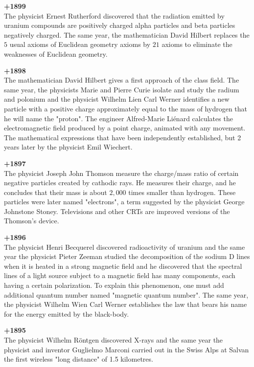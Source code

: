 \textbf{+1899}\\
The physicist Ernest Rutherford discovered that the radiation emitted by uranium compounds are positively charged alpha particles and beta particles negatively charged. The same year, the mathematician David Hilbert replaces the $5$ usual axioms of Euclidean geometry axioms by $21$ axioms to eliminate the weaknesses of Euclidean geometry. 

\textbf{+1898}\\
The mathematician David Hilbert gives a first approach of the class field. The same year, the physicists Marie and Pierre Curie isolate and study the radium and polonium and the physicist Wilhelm Lien Carl Werner identifies a new particle with a positive charge approximately equal to the mass of hydrogen that he will name the "proton". The engineer Alfred-Marie Liénard calculates the electromagnetic field produced by a point charge, animated with any movement. The mathematical expressions that have been independently established, but 2 years later by the physicist Emil Wiechert.

\textbf{+1897}\\
The physicist Joseph John Thomson measure the charge/mass ratio of certain negative particles created by cathodic rays. He measures their charge, and he concludes that their mass is about $2,000$ times smaller than hydrogen. These particles were later named "electrons", a term suggested by the physicist George Johnstone Stoney. Televisions and other CRTs are improved versions of the Thomson's device.

\textbf{+1896}\\
The physicist Henri Becquerel discovered radioactivity of uranium and the same year the physicist Pieter Zeeman studied the decomposition of the sodium D lines when it is heated in a strong magnetic field and he discovered that the spectral lines of a light source subject to a magnetic field has many components, each having a certain polarization. To explain this phenomenon, one must add additional quantum number named "magnetic quantum number". The same year, the physicist Wilhelm Wien Carl Werner establishes the law that bears his name for the energy emitted by the black-body.

\textbf{+1895}\\
The physicist Wilhelm Röntgen discovered X-rays and the same year the physicist and inventor Guglielmo Marconi carried out in the Swiss Alps at Salvan the first wireless "long distance" of 1.5 kilometres.

